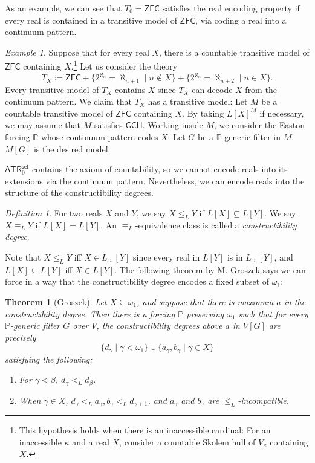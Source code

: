 \documentclass{amsart}
\newtheorem{theorem}{Theorem}[section]
\theoremstyle{remark}
\newtheorem{definition}[definition]{Definition}
\newtheorem{example}[example]{Example}
\newcommand{\ATR}{\mathsf{ATR}}
\newcommand{\set}{\mathsf{set}}
\newcommand{\ZFC}{\mathsf{ZFC}}
\begin{document}
As an example, we can see that $T_0 = \ZFC$ satisfies the real encoding property if every real is contained in a transitive model of $\ZFC$, via coding a real into a continuum pattern.
\begin{example}
    Suppose that for every real $X$, there is a countable transitive model of $\ZFC$ containing $X$.\footnote{This hypothesis holds when there is an inaccessible cardinal: For an inaccessible $\kappa$ and a real $X$, consider a countable Skolem hull of $V_\kappa$ containing $X$.}
    Let us consider the theory
    \begin{equation*}
        T_X:=\mathsf{ZFC}+\{2^{\aleph_n}=\aleph_{n+1} \mid  n\notin X\} +\{2^{\aleph_n}=\aleph_{n+2} \mid n\in X\}.
    \end{equation*}
    Every transitive model of $T_X$ contains $X$ since $T_X$ can decode $X$ from the continuum pattern. We claim that $T_X$ has a transitive model: Let $M$ be a countable transitive model of $\ZFC$ containing $X$. By taking $L[X]^M$ if necessary, we may assume that $M$ satisfies $\mathsf{GCH}$.
    Working inside $M$, we consider the Easton forcing $\mathbb{P}$ whose continuum pattern codes $X$. Let $G$ be a $\mathbb{P}$-generic filter in $M$. $M[G]$ is the desired model.
\end{example}

$\ATR_0^\set$ contains the axiom of countability, so we cannot encode reals into its extensions via the continuum pattern. Nevertheless, we can encode reals into the structure of the constructibility degrees.
\begin{definition}
    For two reals $X$ and $Y$, we say $X\le_L Y$ if $L[X]\subseteq L[Y]$. We say $X \equiv_L Y$ if $L[X]=L[Y]$. An $\equiv_L$-equivalence class is called a \emph{constructibility degree}.
\end{definition}
Note that $X\le_L Y$ iff $X \in L_{\omega_1}[Y]$ since every real in $L[Y]$ is in $L_{\omega_1}[Y]$, and $L[X]\subseteq L[Y]$ iff $X\in L[Y]$.
The following theorem by M. Groszek \cite[Corollary 14]{Groszek1988IteratedPerfect} says we can force in a way that the constructibility degree encodes a fixed subset of $\omega_1$:
\begin{theorem}[Groszek] \label{Theorem: Groszek's theorem} \pushQED{\qed}
    Let $X\subseteq \omega_1$, and suppose that there is maximum $a$ in the constructibility degree. Then there is a forcing $\mathbb{P}$ preserving $\omega_1$ such that for every $\mathbb{P}$-generic filter $G$ over $V$, the constructibility degrees above $a$ in $V[G]$ are precisely
    \begin{equation*}
        \{d_\gamma\mid \gamma<\omega_1 \} \cup \{a_\gamma,b_\gamma\mid \gamma\in X\}
    \end{equation*}
    satisfying the following:
    \begin{enumerate}
        \item For $\gamma<\beta$, $d_\gamma <_L d_\beta$.
        \item When $\gamma\in X$, $d_\gamma <_L a_\gamma,b_\gamma<_L d_{\gamma+1}$, and $a_\gamma$ and $b_\gamma$ are $\le_L$-incompatible. \qedhere 
    \end{enumerate}
\end{theorem}
\end{document}
